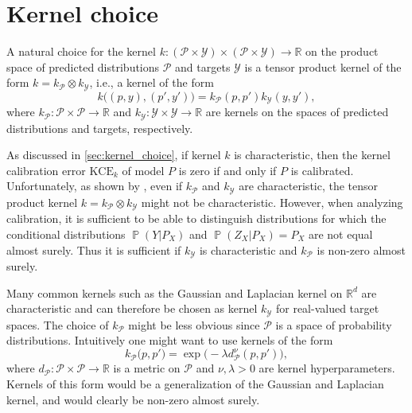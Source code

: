 \documentclass{article}
\DeclareMathOperator{\Prob}{\mathbb{P}}
\begin{document}
\section{Kernel choice}
\label{app:kernel}

A natural choice for the kernel
$k \colon (\mathcal{P} \times \mathcal{Y}) \times (\mathcal{P} \times \mathcal{Y}) \to \mathbb{R}$
on the product space of predicted distributions $\mathcal{P}$ and targets
$\mathcal{Y}$ is a tensor product kernel of the form $k = k_{\mathcal{P}} \otimes k_{\mathcal{Y}}$, i.e.,
a kernel of the form
\begin{equation*}
    k\big((p, y), (p', y')\big) = k_{\mathcal{P}}(p, p') k_{\mathcal{Y}}(y, y'),
\end{equation*}
where $k_{\mathcal{P}}\colon \mathcal{P} \times \mathcal{P} \to \mathbb{R}$ and
$k_{\mathcal{Y}} \colon \mathcal{Y} \times \mathcal{Y} \to \mathbb{R}$ are kernels
on the spaces of predicted distributions and targets, respectively.

As discussed in \cref{sec:kernel_choice}, if kernel $k$ is characteristic,
then the kernel calibration error $\mathrm{KCE}_k$ of model $P$ is zero
if and only if $P$ is calibrated. Unfortunately, as shown by
\citet[Example~1]{Szabo2018}, even if $k_{\mathcal{P}}$ and $k_{\mathcal{Y}}$ are characteristic,
the tensor product kernel $k = k_{\mathcal{P}} \otimes k_{\mathcal{Y}}$ might not be characteristic.
However, when analyzing calibration, it is sufficient to be able to
distinguish distributions for which the conditional distributions $\Prob(Y|P_X)$
and $\Prob(Z_X|P_X) = P_X$ are not equal almost surely. Thus it is sufficient
if $k_{\mathcal{Y}}$ is characteristic and $k_{\mathcal{P}}$ is non-zero almost surely.

Many common kernels such as the Gaussian and Laplacian kernel on
$\mathbb{R}^d$ are characteristic and can therefore be chosen as kernel
$k_{\mathcal{Y}}$ for real-valued target spaces. The choice of $k_{\mathcal{P}}$ might be less obvious
since $\mathcal{P}$ is a space of probability distributions. Intuitively
one might want to use kernels of the form
\begin{equation}\label{eq:kernelform}
    k_{\mathcal{P}}\big(p, p'\big) = \exp{\big(- \lambda d^\nu_{\mathcal{P}}(p, p')\big)},
\end{equation}
where $d_{\mathcal{P}} \colon \mathcal{P} \times \mathcal{P} \to \mathbb{R}$ is a
metric on $\mathcal{P}$ and $\nu, \lambda > 0$ are kernel hyperparameters.
Kernels of this form would be a generalization of the Gaussian and Laplacian
kernel, and would clearly be non-zero almost surely.
\end{document}
